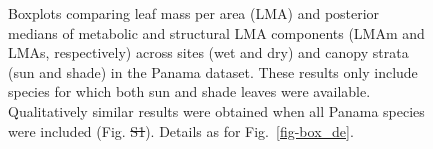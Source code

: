 \documentclass[
  12pt,
  letterpaper,
  DIV=11,
  numbers=noendperiod]{scrartcl}
\providecommand{\DIFadd}[1]{{\protect\color{blue}\uwave{#1}}} %
\providecommand{\DIFdel}[1]{{\protect\color{red}\sout{#1}}}                      %
\providecommand{\DIFaddFL}[1]{\DIFadd{#1}} %
\providecommand{\DIFdelFL}[1]{\DIFdel{#1}} %
\providecommand{\DIFaddbeginFL}{} %
\providecommand{\DIFaddendFL}{} %
\providecommand{\DIFdelbeginFL}{} %
\providecommand{\DIFdelendFL}{} %
\newcommand{\DIFscaledelfig}{0.5}
\newlength{\DIFdelgraphicswidth} %
\newlength{\DIFdelgraphicsheight} %
\newcommand{\DIFaddincludegraphics}[2][]{{\color{blue}\fbox{\DIFOincludegraphics[#1]{#2}}}} %
\newcommand{\DIFdelincludegraphics}[2][]{%
\sbox{\DIFdelgraphicsbox}{\DIFOincludegraphics[#1]{#2}}%
\settoboxwidth{\DIFdelgraphicswidth}{\DIFdelgraphicsbox} %
\settoboxtotalheight{\DIFdelgraphicsheight}{\DIFdelgraphicsbox} %
\scalebox{\DIFscaledelfig}{%
\parbox[b]{\DIFdelgraphicswidth}{\usebox{\DIFdelgraphicsbox}\\[-\baselineskip] \rule{\DIFdelgraphicswidth}{0em}}\llap{\resizebox{\DIFdelgraphicswidth}{\DIFdelgraphicsheight}{%
\setlength{\unitlength}{\DIFdelgraphicswidth}%
\begin{picture}(1,1)%
\thicklines\linethickness{2pt} %
{\color[rgb]{1,0,0}\put(0,0){\framebox(1,1){}}}%
{\color[rgb]{1,0,0}\put(0,0){\line( 1,1){1}}}%
{\color[rgb]{1,0,0}\put(0,1){\line(1,-1){1}}}%
\end{picture}%
}\hspace*{3pt}}} %
} %
\DeclareRobustCommand{\DIFaddbeginFL}{\DIFOaddbeginFL \let\includegraphics\DIFaddincludegraphics} %
\DeclareRobustCommand{\DIFaddendFL}{\DIFOaddendFL \let\includegraphics\DIFOincludegraphics} %
\DeclareRobustCommand{\DIFdelbeginFL}{\DIFOdelbeginFL \let\includegraphics\DIFdelincludegraphics} %
\DeclareRobustCommand{\DIFdelendFL}{\DIFOaddendFL \let\includegraphics\DIFOincludegraphics} %
\begin{document}
\begin{figure}


\caption{\label{fig-box_pa}Boxplots comparing leaf mass per area (LMA)
and posterior medians of metabolic and structural LMA components (LMAm
and LMAs, respectively) across sites (wet and dry) and canopy strata
(sun and shade) in the Panama dataset. These results only include
species for which both sun and shade leaves were available.
Qualitatively similar results were obtained when all Panama species were
included (Fig. \DIFdelbeginFL \DIFdelFL{S1}\DIFdelendFL \DIFaddbeginFL \DIFaddFL{S2}\DIFaddendFL ). Details as for Fig.~\ref{fig-box_de}.}

\end{figure}%

\newpage
\end{document}
